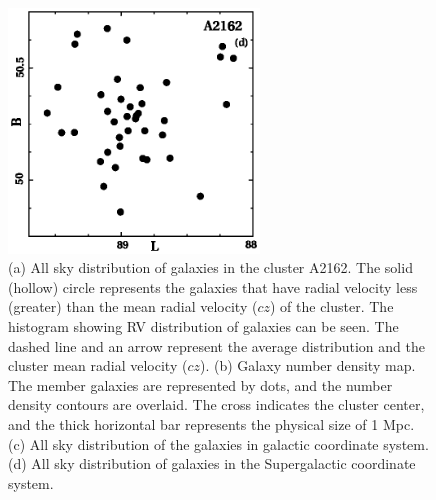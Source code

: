\begin{figure}[H]
   \includegraphics[height=6.5cm]{sup_a2162.eps}
   \caption{(a) All sky distribution of galaxies in the cluster A2162. The solid (hollow) circle represents the galaxies that have radial velocity less (greater) than
      the mean radial velocity ($cz$) of the cluster. The histogram showing RV distribution of galaxies can be seen.
      The dashed line and an arrow represent the average distribution and the cluster mean radial velocity ($cz$).
      (b) Galaxy number density map. The member galaxies are represented by dots, and the number density contours are overlaid.
      The cross indicates the cluster center, and the thick horizontal bar represents the physical size of 1 Mpc.
    (c) All sky distribution of the galaxies in galactic coordinate system. (d) All sky distribution of galaxies in the Supergalactic coordinate system.}
\end{figure}
